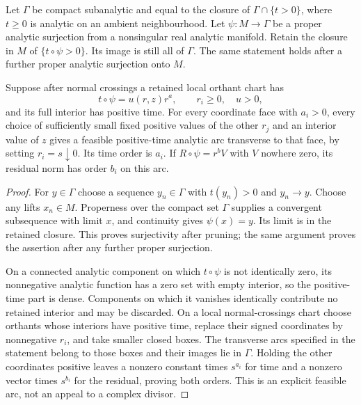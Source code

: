 \begin{lemma}\label{lem:accessible}
Let $\Gamma$ be compact subanalytic and equal to the closure of $\Gamma\cap\{t>0\}$, where $t\ge0$ is analytic on an ambient neighbourhood. Let $\psi:M\to\Gamma$ be a proper analytic surjection from a nonsingular real analytic manifold. Retain the closure in $M$ of $\{t\circ\psi>0\}$. Its image is still all of $\Gamma$. The same statement holds after a further proper analytic surjection onto $M$.

Suppose after normal crossings a retained local orthant chart has
\[
 t\circ\psi=u(r,z)r^a,\qquad r_i\ge0,\quad u>0,
\]
and its full interior has positive time. For every coordinate face with $a_i>0$, every choice of sufficiently small fixed positive values of the other $r_j$ and an interior value of $z$ gives a feasible positive-time analytic arc transverse to that face, by setting $r_i=s\downarrow0$. Its time order is $a_i$. If $R\circ\psi=r^bV$ with $V$ nowhere zero, its residual norm has order $b_i$ on this arc.
\end{lemma}
\begin{proof}
For $y\in\Gamma$ choose a sequence $y_n\in\Gamma$ with $t(y_n)>0$ and $y_n\to y$. Choose any lifts $x_n\in M$. Properness over the compact set $\Gamma$ supplies a convergent subsequence with limit $x$, and continuity gives $\psi(x)=y$. Its limit is in the retained closure. This proves surjectivity after pruning; the same argument proves the assertion after any further proper surjection.

On a connected analytic component on which $t\circ\psi$ is not identically zero, its nonnegative analytic function has a zero set with empty interior, so the positive-time part is dense. Components on which it vanishes identically contribute no retained interior and may be discarded. On a local normal-crossings chart choose orthants whose interiors have positive time, replace their signed coordinates by nonnegative $r_i$, and take smaller closed boxes. The transverse arcs specified in the statement belong to those boxes and their images lie in $\Gamma$. Holding the other coordinates positive leaves a nonzero constant times $s^{a_i}$ for time and a nonzero vector times $s^{b_i}$ for the residual, proving both orders. This is an explicit feasible arc, not an appeal to a complex divisor.
\end{proof}

